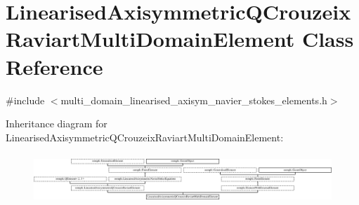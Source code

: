 \hypertarget{classLinearisedAxisymmetricQCrouzeixRaviartMultiDomainElement}{}\section{Linearised\+Axisymmetric\+Q\+Crouzeix\+Raviart\+Multi\+Domain\+Element Class Reference}
\label{classLinearisedAxisymmetricQCrouzeixRaviartMultiDomainElement}


{\ttfamily \#include $<$multi\+\_\+domain\+\_\+linearised\+\_\+axisym\+\_\+navier\+\_\+stokes\+\_\+elements.\+h$>$}

Inheritance diagram for Linearised\+Axisymmetric\+Q\+Crouzeix\+Raviart\+Multi\+Domain\+Element\+:\begin{figure}[H]
\begin{center}
\leavevmode
\includegraphics[height=1.912568cm]{classLinearisedAxisymmetricQCrouzeixRaviartMultiDomainElement}
\end{center}
\end{figure}
